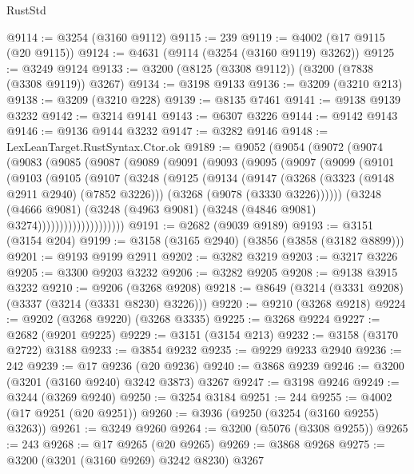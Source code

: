 \begin{lexlean}{RustStd}
\begin{coremodule}
{\begin{coremodule}
{{{{{{{{{{{{{{{{{{{{{{{{{@9114 := @3254 (@3160 @9112)
@9115 := 239
@9119 := @4002 (@17 @9115 (@20 @9115))
@9124 := @4631 (@9114 (@3254 (@3160 @9119) @3262))
@9125 := @3249 @9124
@9133 := @3200 (@8125 (@3308 @9112)) (@3200 (@7838 (@3308 @9119)) @3267)
@9134 := @3198 @9133
@9136 := @3209 (@3210 @213)
@9138 := @3209 (@3210 @228)
@9139 := @8135 @7461
@9141 := @9138 @9139 @3232
@9142 := @3214 @9141
@9143 := @6307 @3226
@9144 := @9142 @9143
@9146 := @9136 @9144 @3232
@9147 := @3282 @9146
@9148 := LexLeanTarget.RustSyntax.Ctor.ok
@9189 := @9052
    (@9054
      (@9072
        (@9074
          (@9083
            (@9085
              (@9087
                (@9089
                  (@9091
                    (@9093
                      (@9095
                        (@9097
                          (@9099
                            (@9101
                              (@9103
                                (@9105
                                  (@9107
                                    (@3248
                                      (@9125
                                        (@9134
                                          (@9147
                                            (@3268 (@3323 (@9148 @2911 @2940) (@7852 @3226)))
                                            (@3268 (@9078 (@3330 @3226))))))
                                      (@3248
                                        (@4666 @9081)
                                        (@3248
                                          (@4963 @9081)
                                          (@3248 (@4846 @9081) @3274))))))))))))))))))))
@9191 := @2682 (@9039 @9189)
@9193 := @3151 (@3154 @204)
@9199 := @3158 (@3165 @2940) (@3856 (@3858 (@3182 @8899)))
@9201 := @9193 @9199 @2911
@9202 := @3282 @3219
@9203 := @3217 @3226
@9205 := @3300 @9203 @3232
@9206 := @3282 @9205
@9208 := @9138 @3915 @3232
@9210 := @9206 (@3268 @9208)
@9218 := @8649 (@3214 (@3331 @9208) (@3337 (@3214 (@3331 @8230) @3226)))
@9220 := @9210 (@3268 @9218)
@9224 := @9202 (@3268 @9220) (@3268 @3335)
@9225 := @3268 @9224
@9227 := @2682 (@9201 @9225)
@9229 := @3151 (@3154 @213)
@9232 := @3158 (@3170 @2722) @3188
@9233 := @3854 @9232
@9235 := @9229 @9233 @2940
@9236 := 242
@9239 := @17 @9236 (@20 @9236)
@9240 := @3868 @9239
@9246 := @3200 (@3201 (@3160 @9240) @3242 @3873) @3267
@9247 := @3198 @9246
@9249 := @3244 (@3269 @9240)
@9250 := @3254 @3184
@9251 := 244
@9255 := @4002 (@17 @9251 (@20 @9251))
@9260 := @3936 (@9250 (@3254 (@3160 @9255) @3263))
@9261 := @3249 @9260
@9264 := @3200 (@5076 (@3308 @9255))
@9265 := 243
@9268 := @17 @9265 (@20 @9265)
@9269 := @3868 @9268
@9275 := @3200 (@3201 (@3160 @9269) @3242 @8230) @3267
}}}}}}}}}}}}}}}}}}}}}}}}}
\end{coremodule}}
\end{coremodule}
\end{lexlean}
